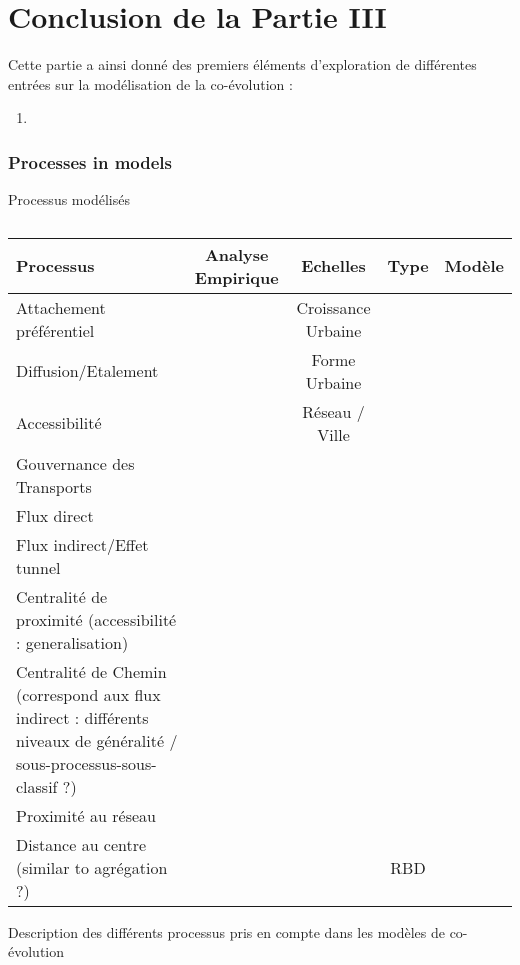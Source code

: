 





\chapter*{Conclusion de la Partie III}






Cette partie a ainsi donné des premiers éléments d'exploration de différentes entrées sur la modélisation de la co-évolution :
\begin{enumerate}
	\item 
\end{enumerate}




\subsection*{Processes in models}{Processus modélisés}


\begin{table}
\begin{tabular}[6pt]{m{4cm}|c|c|c|c}
Processus & Analyse Empirique & Echelles & Type & Modèle \\\hline
Attachement préférentiel & & Croissance Urbaine & & \\\hline
Diffusion/Etalement & & Forme Urbaine & &\\\hline
Accessibilité  & & Réseau / Ville & & \\\hline
Gouvernance des Transports & & & &\\\hline
Flux direct  & & & &\\\hline
Flux indirect/Effet tunnel & & & &\\\hline
Centralité de proximité (accessibilité : generalisation) & & & &\\\hline
Centralité de Chemin (correspond aux flux indirect : différents niveaux de généralité / sous-processus-sous-classif ?) & & & &\\\hline
Proximité au réseau & & & &\\\hline
Distance au centre (similar to agrégation ?) & & & RBD &\\\hline
\end{tabular}
\caption{}{Description des différents processus pris en compte dans les modèles de co-évolution}
\end{table}

